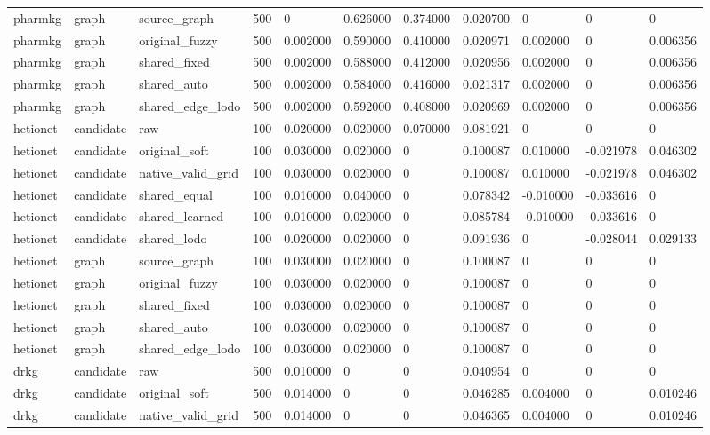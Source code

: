 \begin{tabular}{lllllllllll}
pharmkg & graph & source\_graph & 500 & 0 & 0.626000 & 0.374000 & 0.020700 & 0 & 0 & 0 \\
pharmkg & graph & original\_fuzzy & 500 & 0.002000 & 0.590000 & 0.410000 & 0.020971 & 0.002000 & 0 & 0.006356 \\
pharmkg & graph & shared\_fixed & 500 & 0.002000 & 0.588000 & 0.412000 & 0.020956 & 0.002000 & 0 & 0.006356 \\
pharmkg & graph & shared\_auto & 500 & 0.002000 & 0.584000 & 0.416000 & 0.021317 & 0.002000 & 0 & 0.006356 \\
pharmkg & graph & shared\_edge\_lodo & 500 & 0.002000 & 0.592000 & 0.408000 & 0.020969 & 0.002000 & 0 & 0.006356 \\
hetionet & candidate & raw & 100 & 0.020000 & 0.020000 & 0.070000 & 0.081921 & 0 & 0 & 0 \\
hetionet & candidate & original\_soft & 100 & 0.030000 & 0.020000 & 0 & 0.100087 & 0.010000 & -0.021978 & 0.046302 \\
hetionet & candidate & native\_valid\_grid & 100 & 0.030000 & 0.020000 & 0 & 0.100087 & 0.010000 & -0.021978 & 0.046302 \\
hetionet & candidate & shared\_equal & 100 & 0.010000 & 0.040000 & 0 & 0.078342 & -0.010000 & -0.033616 & 0 \\
hetionet & candidate & shared\_learned & 100 & 0.010000 & 0.020000 & 0 & 0.085784 & -0.010000 & -0.033616 & 0 \\
hetionet & candidate & shared\_lodo & 100 & 0.020000 & 0.020000 & 0 & 0.091936 & 0 & -0.028044 & 0.029133 \\
hetionet & graph & source\_graph & 100 & 0.030000 & 0.020000 & 0 & 0.100087 & 0 & 0 & 0 \\
hetionet & graph & original\_fuzzy & 100 & 0.030000 & 0.020000 & 0 & 0.100087 & 0 & 0 & 0 \\
hetionet & graph & shared\_fixed & 100 & 0.030000 & 0.020000 & 0 & 0.100087 & 0 & 0 & 0 \\
hetionet & graph & shared\_auto & 100 & 0.030000 & 0.020000 & 0 & 0.100087 & 0 & 0 & 0 \\
hetionet & graph & shared\_edge\_lodo & 100 & 0.030000 & 0.020000 & 0 & 0.100087 & 0 & 0 & 0 \\
drkg & candidate & raw & 500 & 0.010000 & 0 & 0 & 0.040954 & 0 & 0 & 0 \\
drkg & candidate & original\_soft & 500 & 0.014000 & 0 & 0 & 0.046285 & 0.004000 & 0 & 0.010246 \\
drkg & candidate & native\_valid\_grid & 500 & 0.014000 & 0 & 0 & 0.046365 & 0.004000 & 0 & 0.010246 \\

\end{tabular}
